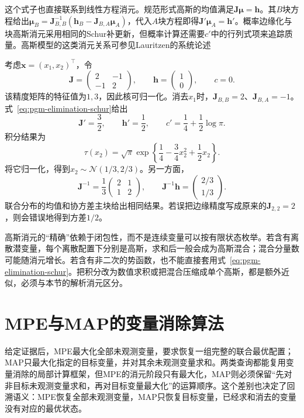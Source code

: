 这个式子也直接联系到线性方程消元。规范形式高斯的均值满足$\bm{J}\bm{\mu}=\bm{h}$。其$B$块方程给出$\bm{\mu}_B=\bm{J}_{B,B}^{-1}(\bm{h}_B-\bm{J}_{B,A}\bm{\mu}_A)$，代入$A$块方程即得$\bm{J}'\bm{\mu}_A=\bm{h}'$。概率边缘化与块高斯消元采用相同的Schur补更新，但概率计算还需要$c'$中的行列式项来追踪质量。高斯模型的这类消元关系可参见Lauritzen的系统论述

\begin{example}[一个二维高斯核的积分]
  \label{ex:pgm-elimination-gaussian-numeric}
  考虑$\bm{x}=(x_1,x_2)^{\top}$，令
  \[
    \bm{J}=\begin{pmatrix}2&-1\\-1&2\end{pmatrix},
    \qquad
    \bm{h}=\begin{pmatrix}1\\0\end{pmatrix},
    \qquad c=0.
  \]
  该精度矩阵的特征值为$1,3$，因此核可归一化。消去$x_1$时，$\bm{J}_{B,B}=2$、$\bm{J}_{B,A}=-1$。式~\eqref{eq:pgm-elimination-schur}给出
  \[
    \bm{J}'=\frac32,\qquad \bm{h}'=\frac12,\qquad
    c'=\frac14+\frac12\log\pi.
  \]
  积分结果为
  \[
    \tau(x_2)=\sqrt{\pi}\exp\!\left\{
      \frac14-\frac34x_2^2+\frac12x_2\right\}.
  \]
  将它归一化，得到$x_2\sim\mathcal{N}(1/3,2/3)$。另一方面，
  \[
    \bm{J}^{-1}=\frac13
      \begin{pmatrix}2&1\\1&2\end{pmatrix},
    \qquad
    \bm{J}^{-1}\bm{h}=
      \begin{pmatrix}2/3\\1/3\end{pmatrix}.
  \]
  联合分布的均值和协方差主块给出相同结果。若误把边缘精度写成原来的$\bm{J}_{2,2}=2$，则会错误地得到方差$1/2$。
\end{example}

高斯消元的“精确”依赖于闭包性，而不是连续变量可以按有限状态枚举。若含有离散潜变量，每个离散配置下分别是高斯，求和后一般会成为高斯混合；混合分量数可能随消元增长。若含有非二次的势函数，也不能直接套用式~\eqref{eq:pgm-elimination-schur}。把积分改为数值求积或把混合压缩成单个高斯，都是额外近似，必须与本节的解析消元区分。

\section{MPE与MAP的变量消除算法}
\label{sec:pgm-elimination-max-product}

给定证据后，MPE最大化全部未观测变量，要求恢复一组完整的联合最优配置；MAP只最大化指定的目标变量，并对其余未观测变量求和。两类查询都能复用变量消除的局部计算框架，但MPE的消元阶段只有最大化，MAP则必须保留“先对非目标未观测变量求和，再对目标变量最大化”的运算顺序。这个差别也决定了回溯语义：MPE恢复全部未观测变量，MAP只恢复目标变量，已经求和消去的变量没有对应的最优状态。

